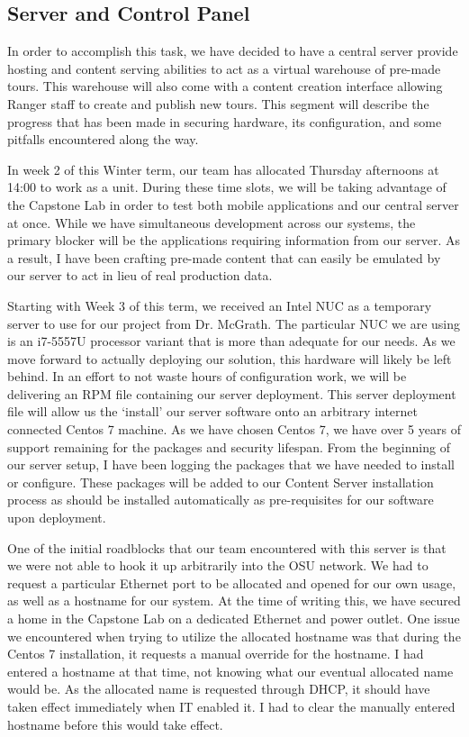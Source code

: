 \documentclass[letterpaper, 10pt,titlepage]{article}
\begin{document}
\subsection{Server and Control Panel}
In order to accomplish this task, we have decided to have a central server provide hosting and content serving abilities to act as a virtual warehouse of pre-made tours. This warehouse will also come with a content creation interface allowing Ranger staff to create and publish new tours. This segment will describe the progress that has been made in securing hardware, its configuration, and some pitfalls encountered along the way.

In week 2 of this Winter term, our team has allocated Thursday afternoons at 14:00 to work as a unit. During these time slots, we will be taking advantage of the Capstone Lab in order to test both mobile applications and our central server at once. While we have simultaneous development across our systems, the primary blocker will be the applications requiring information from our server. As a result, I have been crafting pre-made content that can easily be emulated by our server to act in lieu of real production data.

Starting with Week 3 of this term, we received an Intel NUC as a temporary server to use for our project from Dr. McGrath. The particular NUC we are using is an i7-5557U processor variant that is more than adequate for our needs. As we move forward to actually deploying our solution, this hardware will likely be left behind. In an effort to not waste hours of configuration work, we will be delivering an RPM file containing our server deployment. This server deployment file will allow us the ‘install’ our server software onto an arbitrary internet connected Centos 7 machine. As we have chosen Centos 7, we have over 5 years of support remaining for the packages and security lifespan. From the beginning of our server setup, I have been logging the packages that we have needed to install or configure. These packages will be added to our Content Server installation process as should be installed automatically as pre-requisites for our software upon deployment.

One of the initial roadblocks that our team encountered with this server is that we were not able to hook it up arbitrarily into the OSU network. We had to request a particular Ethernet port to be allocated and opened for our own usage, as well as a hostname for our system. At the time of writing this, we have secured a home in the Capstone Lab on a dedicated Ethernet and power outlet. One issue we encountered when trying to utilize the allocated hostname was that during the Centos 7 installation, it requests a manual override for the hostname. I had entered a hostname at that time, not knowing what our eventual allocated name would be. As the allocated name is requested through DHCP, it should have taken effect immediately when IT enabled it. I had to clear the manually entered hostname before this would take effect.
\end{document}
